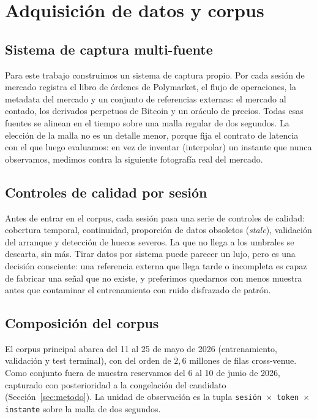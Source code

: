 \documentclass[11pt,a4paper]{article}
\begin{document}
\section{Adquisición de datos y corpus}
\label{sec:datos}

\subsection{Sistema de captura multi-fuente}

Para este trabajo construimos un sistema de captura propio. Por cada sesión de
mercado registra el libro de órdenes de Polymarket, el flujo de operaciones, la
metadata del mercado y un conjunto de referencias externas: el mercado al contado,
los derivados perpetuos de Bitcoin y un oráculo de precios. Todas esas fuentes se
alinean en el tiempo sobre una malla regular de dos segundos. La elección de la
malla no es un detalle menor, porque fija el contrato de latencia con el que luego
evaluamos: en vez de inventar (interpolar) un instante que nunca observamos,
medimos contra la siguiente fotografía real del mercado.

\subsection{Controles de calidad por sesión}

Antes de entrar en el corpus, cada sesión pasa una serie de controles de calidad:
cobertura temporal, continuidad, proporción de datos obsoletos (\emph{stale}),
validación del arranque y detección de huecos severos. La que no llega a los
umbrales se descarta, sin más. Tirar datos por sistema puede parecer un lujo, pero
es una decisión consciente: una referencia externa que llega tarde o incompleta es
capaz de fabricar una señal que no existe, y preferimos quedarnos con menos muestra
antes que contaminar el entrenamiento con ruido disfrazado de patrón.

\subsection{Composición del corpus}

El corpus principal abarca del 11 al 25 de mayo de 2026 (entrenamiento,
validación y test terminal), con del orden de $2{,}6$ millones de filas
cross-venue. Como conjunto fuera de muestra reservamos del 6 al 10 de junio de
2026, capturado con posterioridad a la congelación del candidato
(Sección~\ref{sec:metodo}). La unidad de observación es la tupla
\texttt{sesión $\times$ token $\times$ instante} sobre la malla de dos segundos.
\end{document}
